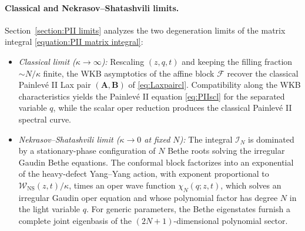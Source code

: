 \documentclass[a4paper,11pt]{article}
\newcommand{\cF}{\mathcal{F}}
\numberwithin{equation}{section}
\begin{document}
\paragraph{Classical and Nekrasov--Shatashvili limits.}
Section~\ref{section:PII limits} analyzes the two degeneration limits of the matrix integral \eqref{equation:PII matrix integral}:
\begin{itemize}[leftmargin=1.5em]
	\item \emph{Classical limit ($\kappa\to\infty$):} Rescaling $(z,q,t)$ and keeping the filling fraction $\sim N/\kappa$ finite, the WKB asymptotics of the affine block $\cF$ recover the classical Painlev\'e II Lax pair $(\mathbf{A},\mathbf{B})$ of \eqref{eq:Laxpaircl}.  Compatibility along the WKB characteristics yields the Painlev\'e II equation \eqref{eq:PIIscl} for the separated variable $q$, while the scalar oper reduction produces the classical Painlev\'e II spectral curve.
	\item \emph{Nekrasov--Shatashvili limit ($\kappa\to0$ at fixed $N$):} The integral $\mathcal{I}_{N}$ is dominated by a stationary-phase configuration of $N$ Bethe roots solving the irregular Gaudin Bethe equations.  The conformal block factorizes into an exponential of the heavy-defect Yang--Yang action, with exponent proportional to $\mathcal{W}_{\mathrm{NS}}(z,t)/\kappa$, times an oper wave function $\chi_{N}(q;z,t)$, which solves an irregular Gaudin oper equation and whose polynomial factor has degree $N$ in the light variable $q$.  For generic parameters, the Bethe eigenstates furnish a complete joint eigenbasis of the $(2N+1)$-dimensional polynomial sector.
\end{itemize}
\end{document}
